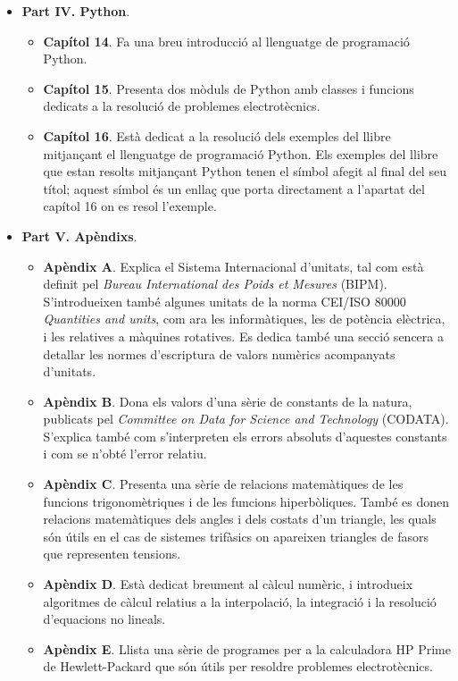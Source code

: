 \begin{itemize}
\begin{itemize}
		\end{itemize}
		\item \textbf{Part IV. Python}. 
		\begin{itemize}
			\item \textbf{Capítol 14}. Fa una breu introducció al llenguatge de programació Python.
			\item \textbf{Capítol 15}. Presenta dos mòduls de Python amb classes i funcions dedicats a la resolució de problemes electrotècnics.
			\item \textbf{Capítol 16}. Està dedicat  a la resolució dels exemples del llibre mitjançant el llenguatge de programació Python. Els exemples del llibre que estan resolts mitjançant Python tenen el símbol \faPython{} afegit al final del seu títol; aquest símbol és un enllaç que porta directament a l'apartat del capítol 16 on es resol l'exemple.
		\end{itemize}
		\item \textbf{Part V. Apèndixs}. 
		\begin{itemize}
			\item \textbf{Apèndix A}. Explica el Sistema Internacional d'unitats, tal com està definit pel \textit{Bureau International des Poids et Mesures} (BIPM). S'introdueixen també algunes unitats de la norma CEI/ISO 80000 \textit{Quantities and units}, com ara les informàtiques, les de potència elèctrica, i les relatives a màquines rotatives. Es dedica també una secció sencera a detallar les normes d'escriptura de valors numèrics acompanyats d'unitats.
			\item \textbf{Apèndix B}. Dona els valors d'una sèrie de constants de la natura,   publicats
			pel \textit{Committee on Data for
			Science and Technology} (CODATA). S'explica també com s'interpreten els errors absoluts d'aquestes constants i com se n'obté l'error relatiu.
			\item \textbf{Apèndix C}. Presenta una sèrie de relacions matemàtiques de les funcions trigonomètriques i de les funcions hiperbòliques. També es donen relacions matemàtiques dels angles i dels costats d'un triangle, les quals són útils en el cas de sistemes trifàsics on apareixen triangles de fasors que representen tensions.
			\item \textbf{Apèndix D}. Està dedicat breument al càlcul numèric, i introdueix algoritmes de càlcul relatius a la interpolació, la integració i la resolució d'equacions no lineals.
			\item \textbf{Apèndix E}. Llista una sèrie de programes per a la calculadora \textsf{HP Prime} de Hewlett-Packard que són útils per resoldre problemes electrotècnics. 

\end{itemize}
\end{itemize}
